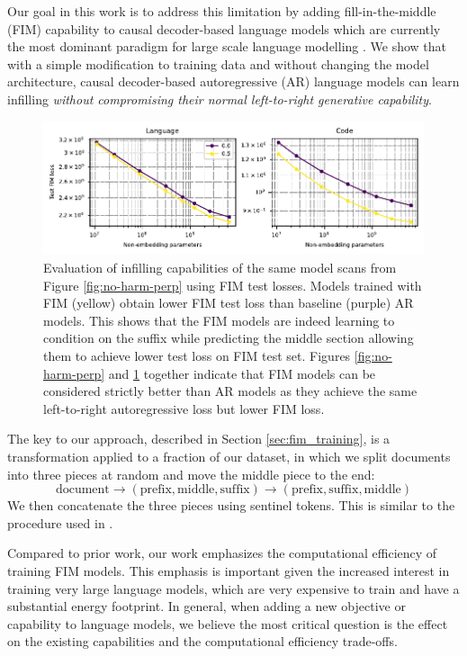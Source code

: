 \documentclass[postscript]{article}
\begin{document}
Our goal in this work is to address this limitation by adding fill-in-the-middle (FIM) capability to causal decoder-based language models which are currently the most dominant paradigm for large scale language modelling \citep{gpt3, chinchi, palm}. We show that with a simple modification to training data and without changing the model architecture, causal decoder-based autoregressive (AR) language models can learn infilling \emph{without compromising their normal left-to-right generative capability}.

\begin{figure}[ht!]
\centering
\includegraphics[width=\textwidth]{figures/final-fim-loss-vs-compute.pdf}
\caption{Evaluation of infilling capabilities of the same model scans from Figure \ref{fig:no-harm-perp} using FIM test losses. Models trained with FIM (yellow) obtain lower FIM test loss than baseline (purple) AR models. This shows that the FIM models are indeed learning to condition on the suffix while predicting the middle section allowing them to achieve lower test loss on FIM test set. Figures \ref{fig:no-harm-perp} and \ref{fig:fim_loss} together indicate that FIM models can be considered strictly better than AR models as they achieve the same left-to-right autoregressive loss but lower FIM loss.}
\label{fig:fim_loss}
\end{figure}

The key to our approach, described in Section \ref{sec:fim_training}, is a transformation applied to a fraction of our dataset, in which we split documents into three pieces at random and move the middle piece to the end:
\[  \text{document} \rightarrow (\text{prefix}, \text{middle}, \text{suffix}) \rightarrow (\text{prefix}, \text{suffix}, \text{middle}) \]
We then concatenate the three pieces using sentinel tokens. This is similar to the procedure used in \citep{donahue, cm3, incoder}.


Compared to prior work, our work emphasizes the computational efficiency of training FIM models. This emphasis is important given the increased interest in training very large language models, which are very expensive to train and have a substantial energy footprint. In general, when adding a new objective or capability to language models, we believe the most critical question is the effect on the existing capabilities and the computational efficiency trade-offs. 
\end{document}
